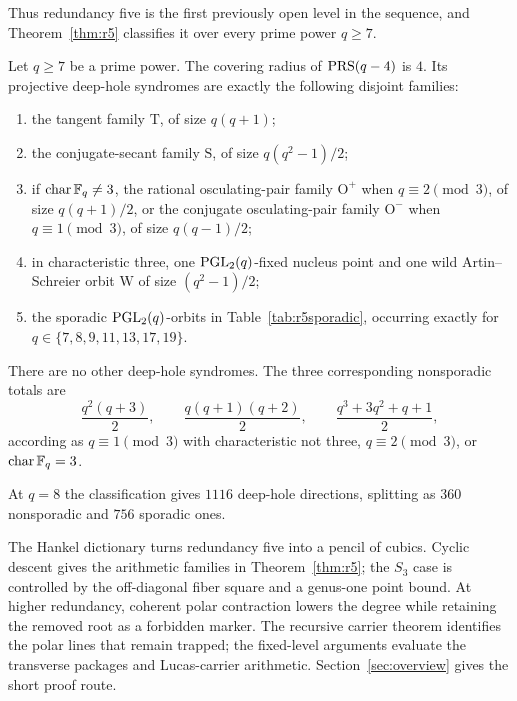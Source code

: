 Thus redundancy five is the first previously open level in the sequence,
and Theorem~\ref{thm:r5} classifies it over every prime power \(q\geq7\).

\begin{theorem}\label{thm:r5}%
%
%
%
%
Let $q\geq7$ be a prime power.  The covering radius of $\operatorname{PRS}(q-4)$ is
$4$.  Its projective deep-hole syndromes are exactly the following
disjoint families:
\begin{enumerate}[label=\textup{(\roman*)}]
\item the tangent family $\mathrm T$, of size $q(q+1)$;
\item the conjugate-secant family $\mathrm S$, of size
      $q(q^2-1)/2$;
\item if $\operatorname{char}\mathbb F_q\ne3$, the rational osculating-pair
      family $\mathrm O^+$ when $q\equiv2\pmod3$, of size $q(q+1)/2$,
      or the conjugate osculating-pair family $\mathrm O^-$ when
      $q\equiv1\pmod3$, of size $q(q-1)/2$;
\item in characteristic three, one $\operatorname{PGL}_2(q)$-fixed nucleus point and
      one wild Artin--Schreier orbit $\mathrm W$ of size $(q^2-1)/2$;
\item the sporadic $\operatorname{PGL}_2(q)$-orbits in Table~\ref{tab:r5sporadic},
      occurring exactly for
      $q\in\{7,8,9,11,13,17,19\}$.
\end{enumerate}
There are no other deep-hole syndromes.  The three corresponding
nonsporadic totals are
\[
\frac{q^2(q+3)}2,\qquad
\frac{q(q+1)(q+2)}2,\qquad
\frac{q^3+3q^2+q+1}{2},
\]
according as $q\equiv1\pmod3$ with characteristic not three,
$q\equiv2\pmod3$, or $\operatorname{char}\mathbb F_q=3$.
\end{theorem}

At \(q=8\) the classification gives \(1116\) deep-hole directions,
splitting as \(360\) nonsporadic and \(756\) sporadic ones.

The Hankel dictionary turns redundancy five into a pencil of cubics.
Cyclic descent gives the arithmetic families in
Theorem~\ref{thm:r5}; the \(S_3\) case is controlled by the
off-diagonal fiber square and a genus-one point bound.  At higher
redundancy, coherent polar contraction lowers the degree while retaining the
removed root as a forbidden marker.  The recursive carrier theorem identifies
the polar lines that remain trapped; the fixed-level arguments evaluate the
transverse packages and Lucas-carrier arithmetic.  Section~\ref{sec:overview}
gives the short proof route.

